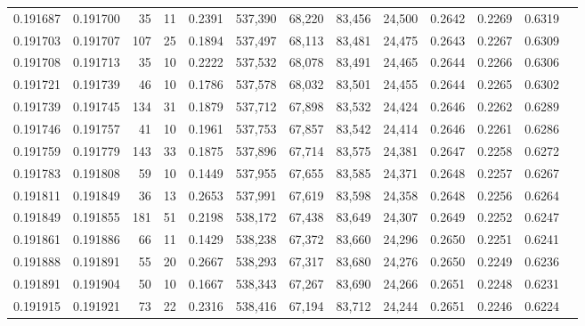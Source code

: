 \begin{tabular}{rrrrrrrrrrrrr}
0.191687 & 0.191700 &    35 &  11 &                                     0.2391 & 537,390 &  68,220 &  83,456 &  24,500 & 0.2642 & 0.2269 & 0.6319 \\
0.191703 & 0.191707 &   107 &  25 &                                     0.1894 & 537,497 &  68,113 &  83,481 &  24,475 & 0.2643 & 0.2267 & 0.6309 \\
0.191708 & 0.191713 &    35 &  10 &                                     0.2222 & 537,532 &  68,078 &  83,491 &  24,465 & 0.2644 & 0.2266 & 0.6306 \\
0.191721 & 0.191739 &    46 &  10 &                                     0.1786 & 537,578 &  68,032 &  83,501 &  24,455 & 0.2644 & 0.2265 & 0.6302 \\
0.191739 & 0.191745 &   134 &  31 &                                     0.1879 & 537,712 &  67,898 &  83,532 &  24,424 & 0.2646 & 0.2262 & 0.6289 \\
0.191746 & 0.191757 &    41 &  10 &                                     0.1961 & 537,753 &  67,857 &  83,542 &  24,414 & 0.2646 & 0.2261 & 0.6286 \\
0.191759 & 0.191779 &   143 &  33 &                                     0.1875 & 537,896 &  67,714 &  83,575 &  24,381 & 0.2647 & 0.2258 & 0.6272 \\
0.191783 & 0.191808 &    59 &  10 &                                     0.1449 & 537,955 &  67,655 &  83,585 &  24,371 & 0.2648 & 0.2257 & 0.6267 \\
0.191811 & 0.191849 &    36 &  13 &                                     0.2653 & 537,991 &  67,619 &  83,598 &  24,358 & 0.2648 & 0.2256 & 0.6264 \\
0.191849 & 0.191855 &   181 &  51 &                                     0.2198 & 538,172 &  67,438 &  83,649 &  24,307 & 0.2649 & 0.2252 & 0.6247 \\
0.191861 & 0.191886 &    66 &  11 &                                     0.1429 & 538,238 &  67,372 &  83,660 &  24,296 & 0.2650 & 0.2251 & 0.6241 \\
0.191888 & 0.191891 &    55 &  20 &                                     0.2667 & 538,293 &  67,317 &  83,680 &  24,276 & 0.2650 & 0.2249 & 0.6236 \\
0.191891 & 0.191904 &    50 &  10 &                                     0.1667 & 538,343 &  67,267 &  83,690 &  24,266 & 0.2651 & 0.2248 & 0.6231 \\
0.191915 & 0.191921 &    73 &  22 &                                     0.2316 & 538,416 &  67,194 &  83,712 &  24,244 & 0.2651 & 0.2246 & 0.6224 \\

\end{tabular}
